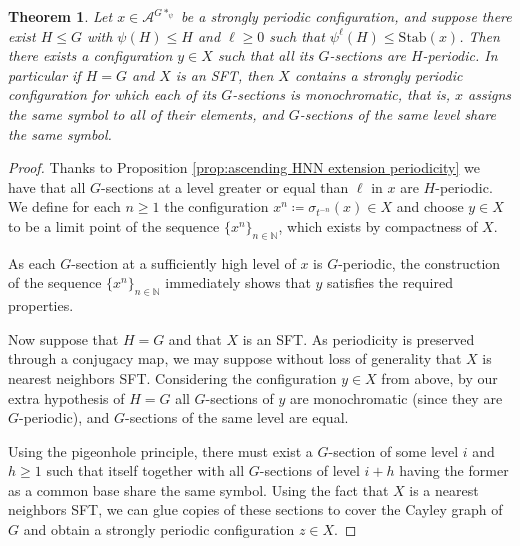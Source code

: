 \documentclass[cupthm,crop,info]{CUP-JNL-ETS}%
\theoremstyle{cupplain}
\newtheorem{theorem}{Theorem}[section]
\theoremstyle{cupdefinition}
\theoremstyle{cupremark}
\theoremstyle{cupproof}
\newtheorem{proof}{Proof}
\numberwithin{equation}{section}
\begin{document}
\begin{theorem}\label{thm: strong H periodicity HNN extensions in subshifts and SFTs}
	Let $x\in \mathcal{A}^{G*_{\psi}}$ be a strongly periodic configuration, and suppose there exist $H\leqslant G$ with $\psi(H)\leqslant H$ and $\ell \ge 0$ such that $\psi^{\ell}(H)\leqslant \mathrm{Stab}(x)$. Then there exists a configuration $y\in X$ such that all its $G$-sections are $H$-periodic. In particular if $H=G$ and $X$ is an SFT, then $X$ contains a strongly periodic configuration for which each of its $G$-sections is monochromatic, that is, $x$ assigns the same symbol to all of their elements, and $G$-sections of the same level share the same symbol.
\end{theorem}
\begin{proof}
	Thanks to Proposition \ref{prop:ascending HNN extension periodicity} we have that all $G$-sections at a level greater or equal than $\ell$ in $x$ are $H$-periodic. We define for each $n\ge 1$ the configuration $x^n\coloneqq\sigma_{t^{-n}}(x)\in X$ and choose $y\in X$ to be a limit point of the sequence $\{x^n\}_{n\in \mathbb{N}}$, which exists by compactness of $X$. 
	
	
	As each $G$-section at a sufficiently high level of $x$ is $G$-periodic, the construction of the sequence $\{x^n\}_{n\in \mathbb{N}}$ immediately shows that $y$ satisfies the required properties.
	
	Now suppose that $H=G$ and that $X$ is an SFT. As periodicity is preserved through a conjugacy map, we may suppose without loss of generality that $X$ is nearest neighbors SFT. Considering the configuration $y\in X$ from above, by our extra hypothesis of $H=G$ all $G$-sections of $y$ are monochromatic (since they are $G$-periodic), and $G$-sections of the same level are equal.
	
	Using the pigeonhole principle, there must exist a $G$-section of some level $i$ and $h\ge 1$ such that itself together with all $G$-sections of level $i+h$ having the former as a common base share the same symbol. Using the fact that $X$ is a nearest neighbors SFT, we can glue copies of these sections to cover the Cayley graph of $G$ and obtain a strongly periodic configuration $z\in X$.
	
\end{proof}
\end{document}
